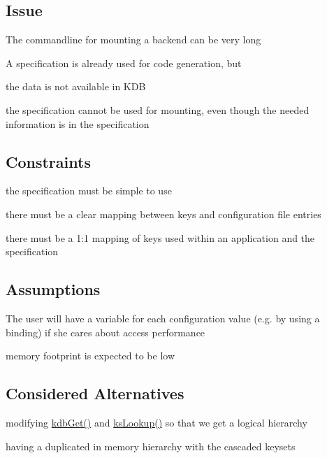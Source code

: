 \subsection*{Issue}


\begin{DoxyItemize}
\item The commandline for mounting a backend can be very long
\item A specification is already used for code generation, but
\begin{DoxyItemize}
\item the data is not available in K\+D\+B
\item the specification cannot be used for mounting, even though the needed information is in the specification
\end{DoxyItemize}
\end{DoxyItemize}

\subsection*{Constraints}


\begin{DoxyItemize}
\item the specification must be simple to use
\item there must be a clear mapping between keys and configuration file entries
\item there must be a 1\+:1 mapping of keys used within an application and the specification
\end{DoxyItemize}

\subsection*{Assumptions}


\begin{DoxyItemize}
\item The user will have a variable for each configuration value (e.\+g. by using a binding) if she cares about access performance
\item memory footprint is expected to be low
\end{DoxyItemize}

\subsection*{Considered Alternatives}


\begin{DoxyItemize}
\item modifying \hyperlink{group__kdb_ga28e385fd9cb7ccfe0b2f1ed2f62453a1}{kdb\+Get()} and \hyperlink{group__keyset_gaa34fc43a081e6b01e4120daa6c112004}{ks\+Lookup()} so that we get a logical hierarchy
\item having a duplicated in memory hierarchy with the cascaded keysets
\end{DoxyItemize}


